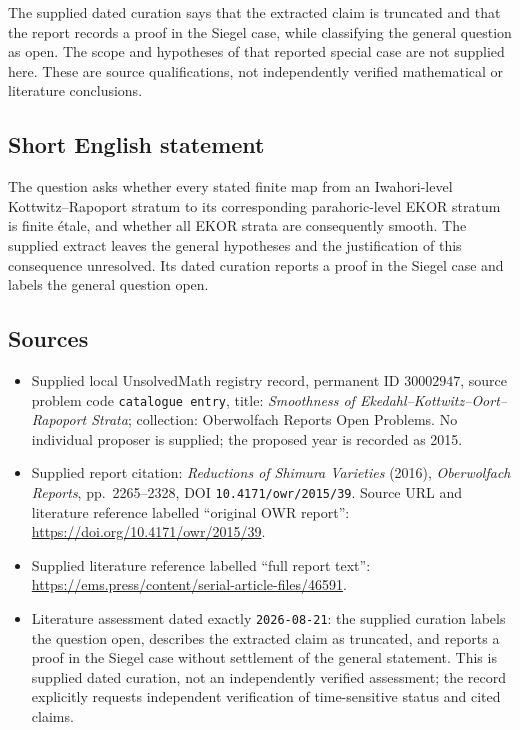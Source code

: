 \documentclass[11pt]{article}
\begin{document}
The supplied dated curation says that the extracted claim is truncated and that the report records a proof in the Siegel case, while classifying the general question as open. The scope and hypotheses of that reported special case are not supplied here. These are source qualifications, not independently verified mathematical or literature conclusions.
\subsection{Short English statement}
The question asks whether every stated finite map from an Iwahori-level Kottwitz--Rapoport stratum to its corresponding parahoric-level EKOR stratum is finite \'{e}tale, and whether all EKOR strata are consequently smooth. The supplied extract leaves the general hypotheses and the justification of this consequence unresolved. Its dated curation reports a proof in the Siegel case and labels the general question open.
\subsection{Sources}
\begin{itemize}
\item Supplied local UnsolvedMath registry record, permanent ID \(30002947\), source problem code \texttt{catalogue entry}, title: \emph{Smoothness of Ekedahl--Kottwitz--Oort--Rapoport Strata}; collection: Oberwolfach Reports Open Problems. No individual proposer is supplied; the proposed year is recorded as 2015.
\item Supplied report citation: \emph{Reductions of Shimura Varieties} (2016), \emph{Oberwolfach Reports}, pp.\ 2265--2328, DOI \texttt{10.4171/owr/2015/39}. Source URL and literature reference labelled ``original OWR report'': \url{https://doi.org/10.4171/owr/2015/39}.
\item Supplied literature reference labelled ``full report text'': \url{https://ems.press/content/serial-article-files/46591}.
\item Literature assessment dated exactly \texttt{2026-08-21}: the supplied curation labels the question open, describes the extracted claim as truncated, and reports a proof in the Siegel case without settlement of the general statement. This is supplied dated curation, not an independently verified assessment; the record explicitly requests independent verification of time-sensitive status and cited claims.
\end{itemize}
\end{document}
